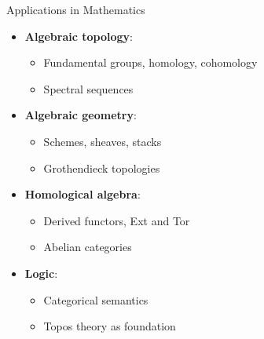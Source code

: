 \documentclass{beamer}
\begin{document}
    \begin{frame}{Applications in Mathematics}
    \begin{itemize}
        \item \textbf{Algebraic topology}:
            \begin{itemize}
                \item Fundamental groups, homology, cohomology
                \item Spectral sequences
            \end{itemize}
        \item \textbf{Algebraic geometry}:
            \begin{itemize}
                \item Schemes, sheaves, stacks
                \item Grothendieck topologies
            \end{itemize}
        \item \textbf{Homological algebra}:
            \begin{itemize}
                \item Derived functors, Ext and Tor
                \item Abelian categories
            \end{itemize}
        \item \textbf{Logic}:
            \begin{itemize}
                \item Categorical semantics
                \item Topos theory as foundation
            \end{itemize}
    \end{itemize}
    \end{frame}
    
\end{document}
